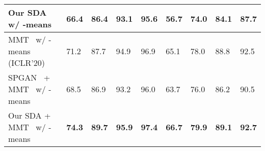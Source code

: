 \documentclass[journal]{IEEEtran}
\begin{document}
\begin{table*}[t]
\begin{center}
\begin{tabular}{P{5cm}|C{1cm}C{1cm}C{1cm}C{1cm}|C{1cm}C{1cm}C{1cm}C{1cm}}
	Our SDA w/ {-means} & {66.4} & {86.4} & {93.1} & {95.6} & {56.7} & {74.0} & {84.1} & {87.7} \\
	\hline
	MMT~\cite{ge2020mutual} w/ {-means} (ICLR'20) & {71.2} & {87.7} & {94.9} & {96.9} & {65.1} & {78.0} & {88.8} & {92.5} \\
	 {SPGAN~\cite{deng2018image} + MMT~\cite{ge2020mutual} w/ {-means}} & 68.5 & 86.9 & 93.2 & 96.0 & 63.7 & 76.0 & 86.2 & 90.5 \\
	Our SDA + MMT~\cite{ge2020mutual} w/ {-means} & \textbf{74.3} & \textbf{89.7} & \textbf{95.9} & \textbf{97.4} & \textbf{66.7} & \textbf{79.9} & \textbf{89.1} & \textbf{92.7} \\
	\hline
	\end{tabular}
	\end{center}
\end{table*}
\end{document}
